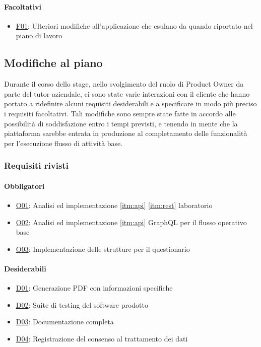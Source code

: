 \paragraph{Facoltativi}
\begin{itemize}
    \item \underline{F01}: Ulteriori modifiche all’applicazione che esulano da quando riportato nel piano di lavoro
\end{itemize}
\subsection{Modifiche al piano}
Durante il corso dello stage, nello svolgimento del ruolo di Product Owner da parte del tutor aziendale, ci sono state varie interazioni con il cliente che hanno portato a ridefinire alcuni requisiti desiderabili e a specificare in modo più preciso i requisiti facoltativi. Tali modifiche sono sempre state fatte in accordo alle possibilità di soddisfazione entro i tempi previsti, e tenendo in mente che la piattaforma sarebbe entrata in produzione al completamento delle funzionalità per l'esecuzione flusso di attività base.
\subsubsection{Requisiti rivisti}
\paragraph{Obbligatori}
\begin{itemize}
    \item \underline{O01}: Analisi ed implementazione \ref{itm:api} \ref{itm:rest} laboratorio
    \item \underline{O02}: Analisi ed implementazione \ref{itm:api} GraphQL per il flusso operativo base
    \item \underline{O03}: Implementazione delle strutture per il questionario
\end{itemize}
\vspace{-15pt}
\paragraph{Desiderabili}
\begin{itemize}
    \item \underline{D01}: Generazione PDF con informazioni specifiche
    \item \underline{D02}: Suite di testing del software prodotto
    \item \underline{D03}: Documentazione completa
    \item \underline{D04}: Registrazione del consenso al trattamento dei dati
\end{itemize}
\vspace{-15pt}
